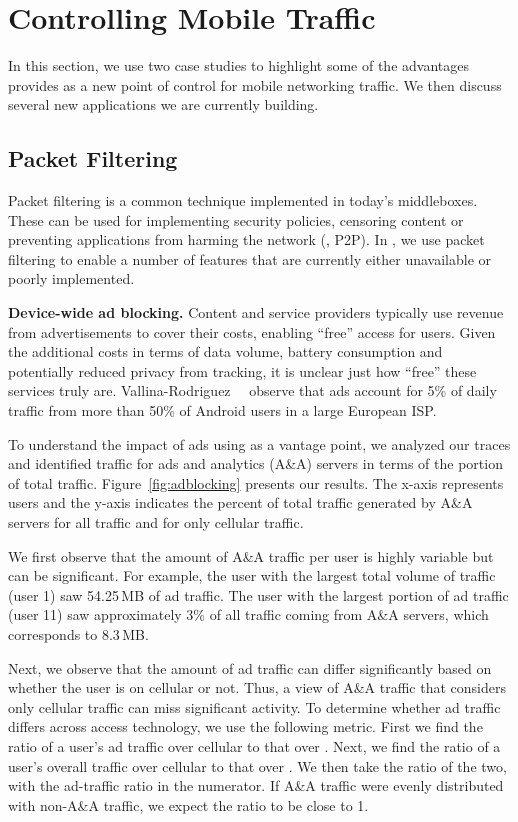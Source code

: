 \section{Controlling Mobile Traffic}
\label{sec:control}
In this section, we use two case studies to highlight some of the 
advantages \meddle provides as a new point of control 
for mobile networking traffic. We then discuss several new applications 
we are currently building.

\subsection{Packet Filtering}
\label{sec:filtering}
Packet filtering is a common technique implemented in 
today's middleboxes. These can be used for implementing 
security policies, censoring content or preventing applications 
from harming the network (\eg, P2P). In \meddle, we use 
packet filtering to enable a number of features that are 
currently either unavailable or poorly implemented.

\noindent\textbf{Device-wide ad blocking.} Content and service providers 
typically use revenue from advertisements to cover their costs, enabling 
``free'' access for users. Given the additional costs in terms of data volume, 
battery consumption and potentially reduced privacy from tracking, it is unclear 
just how ``free'' these services truly are. Vallina-Rodriguez~\etal~\cite{Vallina-rodriguez:2012:AdCache} observe
that ads account for 5\% of daily traffic from more than 50\% of
Android users in a large European ISP. 

To understand the impact of ads using \meddle as a vantage point, we 
analyzed our traces and identified traffic for ads and analytics (A\&A) servers 
in terms of the portion of total traffic. Figure~\ref{fig:adblocking} presents our 
results. The x-axis represents users and the y-axis indicates the percent of 
total traffic generated by A\&A servers for all traffic and for only cellular traffic. 

We first observe that the amount of A\&A traffic per user is highly variable but can be 
significant. For example, the user with the largest total volume of traffic (user 1) saw 
54.25\,MB of ad traffic. The user with the largest portion of ad traffic (user 11) saw 
approximately 3\% of all traffic coming from A\&A servers, which corresponds to 8.3\,MB. 

Next, we observe that the amount of ad traffic can differ significantly 
based on whether the user is on cellular or not. Thus, a view of A\&A 
traffic that considers only cellular traffic can miss significant activity. 
To determine whether ad traffic differs across access technology, we use 
the following metric. First we find the ratio of a user's ad traffic over cellular 
to that over \wifi. Next, we find the ratio of a user's overall traffic over cellular 
to that over \wifi. We then take the ratio of the two, with the ad-traffic ratio 
in the numerator. If A\&A traffic were evenly distributed with non-A\&A traffic, 
we expect the ratio to be close to 1.

